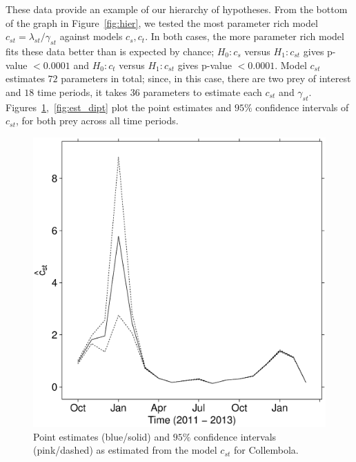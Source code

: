 \documentclass[smallextended]{svjour3}
\begin{document}
These data provide an example of our hierarchy of hypotheses.  From the bottom of the graph in Figure~\ref{fig:hier}, we tested the most parameter rich model $c_{st} = \lambda_{st}/\gamma_{st}$ against models $c_{s}, c_{t}$.  In both cases, the more parameter rich model fits these data better than is expected by chance; $H_0: c_s$ versus $H_1: c_{st}$ gives p-value $< 0.0001$ and $H_0: c_t$ versus $H_1: c_{st}$ gives p-value $< 0.0001$.  Model $c_{st}$ estimates $72$ parameters in total; since, in this case, there are two prey of interest and $18$ time periods, it takes $36$ parameters to estimate each $c_{st}$ and $\gamma_{st}$.  Figures~\ref{fig:est_coll},~\ref{fig:est_dipt} plot the point estimates and $95\%$ confidence intervals of $c_{st}$, for both prey across all time periods.  

\begin{figure}
  \centering
  \includegraphics[scale=0.35]{est_coll}
  \caption{Point estimates (blue/solid) and $95\%$ confidence intervals (pink/dashed) as estimated from the model $c_{st}$ for Collembola.}
  \label{fig:est_coll}
\end{figure}
\end{document}
